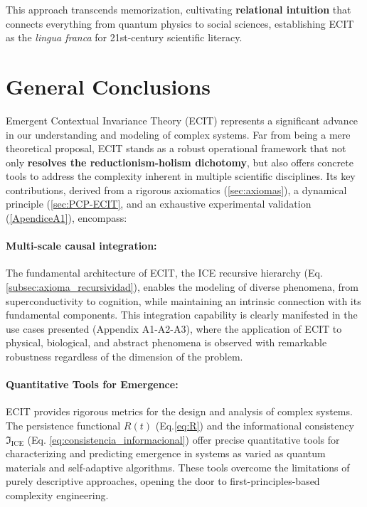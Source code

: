 \documentclass{article}
\begin{document}
This approach transcends memorization, cultivating \textbf{relational intuition} that connects everything from quantum physics to social sciences, establishing ECIT as the \textit{lingua franca} for 21st-century scientific literacy.

\section{General Conclusions}
\noindent Emergent Contextual Invariance Theory (ECIT) represents a significant advance in our understanding and modeling of complex systems. Far from being a mere theoretical proposal, ECIT stands as a robust operational framework that not only \textbf{resolves the reductionism-holism dichotomy}, but also offers concrete tools to address the complexity inherent in multiple scientific disciplines. Its key contributions, derived from a rigorous axiomatics (\ref{sec:axiomas}), a dynamical principle (\ref{sec:PCP-ECIT}, and an exhaustive experimental validation (\ref{ApendiceA1}), encompass:

\paragraph{Multi-scale causal integration:} The fundamental architecture of ECIT, the ICE recursive hierarchy (Eq. \ref{subsec:axioma_recursividad}), enables the modeling of diverse phenomena, from superconductivity to cognition, while maintaining an intrinsic connection with its fundamental components. This integration capability is clearly manifested in the use cases presented (Appendix A1-A2-A3), where the application of ECIT to physical, biological, and abstract phenomena is observed with remarkable robustness regardless of the dimension of the problem.

\paragraph{Quantitative Tools for Emergence:} ECIT provides rigorous metrics for the design and analysis of complex systems. The persistence functional \(R(t)\) (Eq.\ref{eq:R}) and the informational consistency $\mathfrak{I}_\text{ICE}$ (Eq. \ref{eq:consistencia_informacional}) offer precise quantitative tools for characterizing and predicting emergence in systems as varied as quantum materials and self-adaptive algorithms. These tools overcome the limitations of purely descriptive approaches, opening the door to first-principles-based complexity engineering.
\end{document}
